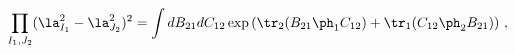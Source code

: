 \begin{equation}
\prod_{I_1,J_2}(\la_{I_1}^2 - \la_{J_2}^2)^2 = \int dB_{2 1} dC_{1 2}
\exp\left( \tr_2 (B_{2 1}\ph_{1}C_{12}) + \tr_1(C_{12}\ph_{2}B_{21})\right)%
\, ,
\end{equation}

